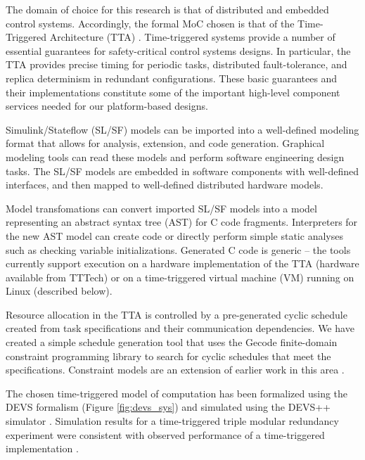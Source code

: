 The domain of choice for this research is that of distributed and embedded control
systems.  Accordingly, the formal MoC chosen is that of the Time-Triggered 
Architecture (TTA) \cite{kopetz:2001-22a}.  Time-triggered systems provide a number
of essential guarantees for safety-critical control systems designs.  In particular,
the TTA provides precise timing for periodic tasks, distributed fault-tolerance,
and replica determinism in redundant configurations.  These basic guarantees and
their implementations constitute some of the important high-level component 
services needed for our platform-based designs.  

Simulink/Stateflow (SL/SF) models can be imported into a well-defined modeling format
that allows for analysis, extension, and code generation.  Graphical modeling
tools can read these models and perform software engineering design tasks.  
The SL/SF models are embedded in software components with well-defined
interfaces, and then mapped to well-defined distributed hardware models.

Model transfomations \cite{isis:great} can convert imported SL/SF models into a 
model representing an abstract syntax tree (AST) for C code fragments.   
Interpreters for the new AST model can create
code or directly perform simple static analyses such as checking variable 
initializations.  Generated C code is generic -- the tools currently support 
execution on a hardware implementation of the TTA (hardware available from TTTech\cite{TTTech})
or on a time-triggered virtual machine (VM) running on Linux (described below).

Resource allocation in the TTA is controlled by a pre-generated cyclic schedule
created from task specifications and their communication dependencies.  We have 
created a simple schedule generation tool that uses the Gecode finite-domain constraint
programming library to search for cyclic schedules that meet the specifications.
Constraint models are an extension of earlier work in this area
\cite{sw:offlinescheduling}.

The chosen time-triggered model of computation has been formalized using the DEVS 
formalism (Figure \ref{fig:devs_sys}) and simulated using the DEVS++ simulator \cite{DEVSpp}.  Simulation 
results for a time-triggered triple modular redundancy experiment were consistent 
with observed performance of a time-triggered implementation \cite{TK_TMR}.


